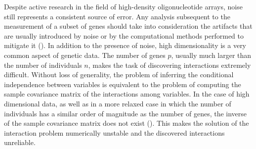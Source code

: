 Despite active research in the field of high-density oligonucleotide arrays, noise still represents a consistent source of error. Any analysis subsequent to the measurement of a subset of genes should take into consideration the artifacts that are usually introduced by noise or by the computational methods performed to mitigate it (\citealp{microarray_noise, microarray_high_noise}).
In addition to the presence of noise, high dimensionality is a very common aspect of genetic data. The number of genes $p$, usually much larger than the number of individuals $n$, makes the task of discovering interactions extremely difficult. 
Without loss of generality, the problem of inferring the conditional independence between variables is equivalent to the problem of computing the sample covariance matrix of the interactions among variables. In the case of high dimensional data, as well as in a more relaxed case in which the number of individuals has a similar order of magnitude as the number of genes, the inverse of the sample covariance matrix does not exist (\citealp{Buhl93mle}). This makes the solution of the interaction problem numerically unstable and the discovered interactions unreliable. 

